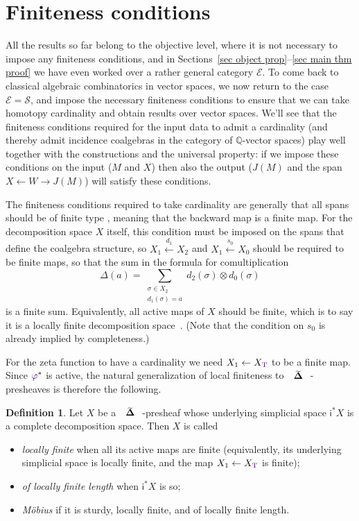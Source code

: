 \documentclass{amsart}
\makeatletter
\newcommand{\xora}{a}
\newcommand{\simpl}{\mathbf{\Delta}}
\newcommand{\spaces}{\mathcal{S}}
\newcommand{\basecat}{\mathcal{E}}
\newcommand*\wt[1]{\mathpalette\wthelper{#1}}
\newcommand*\wthelper[2]{%
        \hbox{\dimen@\accentfontxheight#1%
                \accentfontxheight#11.3\dimen@
                $\m@th#1\widetilde{#2}$%
                \accentfontxheight#1\dimen@
        }%
}
\newcommand*\accentfontxheight[1]{%
        \fontdimen5\ifx#1\displaystyle
                \textfont
        \else\ifx#1\textstyle
                \textfont
        \else\ifx#1\scriptstyle
                \scriptfont
        \else
                \scriptscriptfont
        \fi\fi\fi3
}
\newcommand{\Q}{\mathbb{Q}}
\newcommand{\Tsimpl}{\wt\simpl}
\newcommand{\Tob}{\textup{\color{Indigo}T}}
\newcommand{\sigr}{{\color{Indigo}\varphi}}
\newcommand{\lili}{\mathsf{i}}
\theoremstyle{definition}
\newtheorem{definition}[theorem]{Definition}
\theoremstyle{noname}
\makeatother
\begin{document}
\section{Finiteness conditions}\label{sec finiteness}

All the results so far
belong 
to the objective level, where it is not necessary to impose any 
finiteness conditions,
and in Sections~\ref{sec object prop}--\ref{sec main thm proof}
we have even worked over a rather general category $\basecat$. To come back to
classical algebraic combinatorics in vector spaces, we now return to the case
$\basecat=\spaces$, and impose the necessary finiteness conditions to ensure that we
can take homotopy cardinality and obtain results over vector spaces.
We'll see that the finiteness conditions required
for the input data to admit a cardinality (and thereby admit incidence coalgebras 
in the category of $\Q$-vector spaces) play well together with the constructions and
the universal property: if we impose these conditions on the input ($M$ and $X$) then 
also the output ($J(M)$ and the span $X\leftarrow W \to J(M)$) will satisfy these conditions.

The finiteness conditions required to take cardinality are
generally that all spans should be of finite type \cite{Galvez-Kock-Tonks:1602.05082},
meaning that the backward map is a 
finite map. For the decomposition space $X$ itself, this condition must be imposed on 
the spans that define the coalgebra structure, so $X_1 \stackrel{d_1}\leftarrow X_2$ and
$X_1 \stackrel{s_0}\leftarrow X_0$ should be required to be finite maps,
so that the sum in the formula
for comultiplication
$$
\Delta(\xora) = \sum_{\substack{\sigma\in X_2 \\ d_1(\sigma)=\xora}} d_2(\sigma) \otimes 
d_0(\sigma)$$
is a finite sum. 
Equivalently, all active 
maps of $X$ should be finite, which is to say it is a locally finite decomposition 
space~\cite{GKT2}. (Note that the condition on $s_0$ is already implied by completeness.)

For the zeta function to have a cardinality we need $X_1 \leftarrow X_\Tob$ to be a 
finite map. Since $\sigr^*$ is active, the natural generalization of local finiteness 
to $\Tsimpl$-presheaves is therefore the following.

\begin{definition}
Let $X$ be a $\Tsimpl$-presheaf whose underlying simplicial space $\lili^*X$ is a complete decomposition space.
Then $X$ is called
\begin{itemize}
\item \emph{locally finite} when all its active maps are finite (equivalently, its underlying simplicial space is locally finite, and the map $X_1 \leftarrow X_\Tob$ is finite);
\item \emph{of locally finite length} when $\lili^*X$ is so;
\item \emph{M\"obius} if it is sturdy, locally finite, and of locally finite length.
\end{itemize}
\end{definition}
\end{document}
